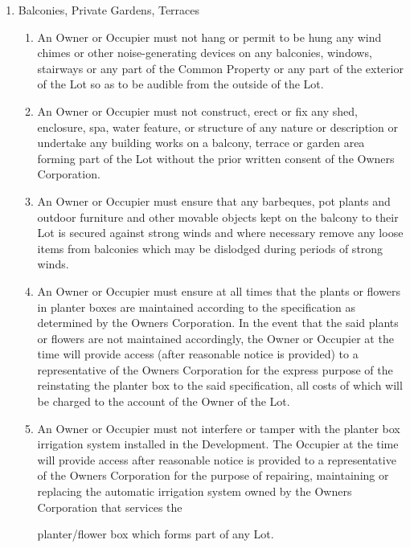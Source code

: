 \documentclass{article}
\begin{document}
\begin{enumerate}[label=\arabic*.]
\begin{enumerate}[label=\arabic{enumi}.\arabic*.]
\begin{enumerate}[label=(\arabic*)]
\begin{enumerate}[label=(\alph*)]
\end{enumerate}

\item  Balconies, Private Gardens, Terraces

\begin{enumerate}[label=(\alph*)]

\item  An Owner or Occupier must not hang or permit to be hung any wind chimes or other noise-generating devices on any balconies, windows, stairways or any part of the  Common Property or any part of the exterior of the Lot so as to be audible from the outside of the Lot.

\item  An Owner or Occupier must not construct, erect or fix any shed, enclosure, spa, water feature, or structure of any nature or description or undertake any building works on a balcony, terrace or garden area forming part of the Lot without the prior written consent of the Owners Corporation.

\item  An Owner or Occupier must ensure that any barbeques, pot plants and outdoor furniture and other movable objects kept on the balcony to their Lot is secured against strong winds and where necessary remove any loose items from balconies which may be dislodged during periods of strong winds.

\item  An Owner or Occupier must ensure at all times that the plants or flowers in planter boxes are maintained according to the specification as determined by the Owners Corporation. In the event that the said plants or flowers are not maintained accordingly, the Owner or Occupier at the time will provide access (after reasonable notice is provided) to a representative of the Owners Corporation for the express purpose of the reinstating the planter box to the said specification, all costs of which will be charged to the account of the Owner of the Lot.

\item  An Owner or Occupier must not interfere or tamper with the planter box irrigation system installed in the Development. The Occupier at the time will provide access after reasonable notice is provided to a representative of the Owners Corporation for the purpose of repairing, maintaining or replacing the automatic irrigation system owned by the Owners Corporation that services the
\newpage

planter/flower box which forms part of any Lot.


\end{enumerate}
\end{enumerate}
\end{enumerate}
\end{enumerate}
\end{document}
